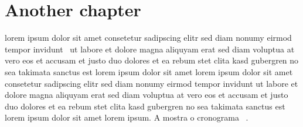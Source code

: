 \chapter{Another chapter}
\label{chap:chap2}

lorem ipsum dolor sit amet consetetur sadipscing elitr sed diam
nonumy eirmod tempor invidunt~\cite{PLASSPAG81} ut labore et
dolore magna aliquyam erat sed diam voluptua at vero eos et
accusam et justo duo dolores et ea rebum stet clita kasd gubergren
no sea takimata sanctus est lorem ipsum dolor sit amet lorem ipsum
dolor sit amet consetetur sadipscing elitr sed diam nonumy eirmod
tempor invidunt ut labore et dolore magna aliquyam erat sed diam
voluptua at vero eos et accusam et justo duo dolores et ea rebum
stet clita kasd gubergren no sea takimata sanctus est lorem ipsum
dolor sit amet lorem ipsum. A  mostra o
cronograma ~\cite{WIKIPIC09}.

\begin{table}[htb]
\begin{center}
\caption{This is a table}%
\setlength{\tabcolsep}{.5cm}%
\end{center}
\label{tab:tab1}
\end{table}

